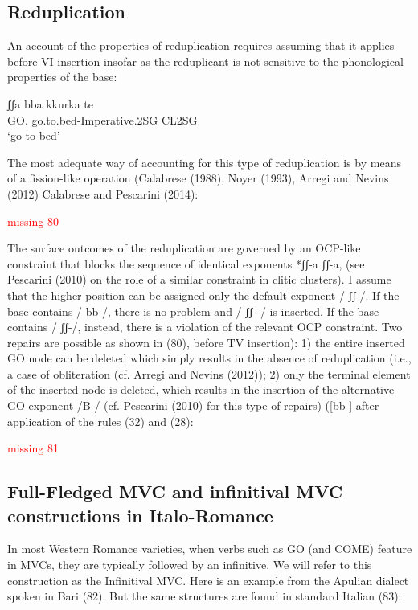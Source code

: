 \documentclass[output=paper,colorlinks,citecolor=brown,
]{langscibook}
\begin{document}
\subsection{Reduplication}

An account of the properties of reduplication requires assuming that it applies before VI insertion insofar as the reduplicant is not sensitive to the phonological properties of the base:

\ea \gll ʃʃa  bba  kkurka te\\
    GO. go.to.bed-Imperative.2SG CL2SG\\
   \glt ‘go to bed’
\z

The most adequate way of accounting for this type of reduplication is by means of a fission-like operation (Calabrese (1988), Noyer (1993), Arregi and Nevins (2012) Calabrese and Pescarini (2014): 


\ea
\textcolor{red}{missing 80}
\z

The surface outcomes of the reduplication are governed by an OCP-like constraint that blocks the sequence of identical exponents *ʃʃ-a ʃʃ-a, (see Pescarini (2010) on the role of a similar constraint in clitic clusters).  I assume that the higher position can be assigned only the default exponent / ʃʃ-/. If the base contains / bb-/, there is no problem and / ʃʃ -/ is inserted.  If the base contains / ʃʃ-/, instead, there is a violation of the relevant OCP constraint.  Two repairs are possible as shown in (80), before TV insertion): 1) the entire inserted GO node can be deleted which simply results in the absence of reduplication (i.e., a case of obliteration (cf. Arregi and Nevins (2012)); 2) only the terminal element of the inserted node is deleted, which results in the insertion of the alternative GO exponent /B-/ (cf. Pescarini (2010) for this type of repairs) ([bb-] after application of the rules (32) and (28):


\ea
\textcolor{red}{missing 81}
\z

\subsection{Full-Fledged MVC and infinitival MVC constructions in Italo-Romance}

In most Western Romance varieties, when verbs such as GO (and COME) feature in MVCs, they are typically followed by an infinitive. We will refer to this construction as the Infinitival MVC. Here is an example from the Apulian dialect spoken in Bari (82).  But the same structures are found in standard Italian (83): 
\end{document}
